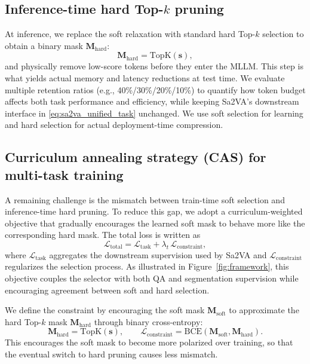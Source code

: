 \subsection{Inference-time hard Top-$k$ pruning}
\label{sec:method_topk_infer}
At inference, we replace the soft relaxation with standard hard Top-$k$ selection to obtain a binary mask $\mathbf{M}_{\mathrm{hard}}$:
\begin{equation}
\mathbf{M}_{\mathrm{hard}}=\mathrm{TopK}(\mathbf{s}),
\label{eq:method_hard_topk}
\end{equation}
and physically remove low-score tokens before they enter the MLLM.
This step is what yields actual memory and latency reductions at test time.
We evaluate multiple retention ratios (e.g., 40\%/30\%/20\%/10\%) to quantify how token budget affects both task performance and efficiency, while keeping Sa2VA's downstream interface in \eqref{eq:sa2va_unified_task} unchanged.
We use soft selection for learning and hard selection for actual deployment-time compression.

\subsection{Curriculum annealing strategy (CAS) for multi-task training}
\label{sec:method_cas}
A remaining challenge is the mismatch between train-time soft selection and inference-time hard pruning.
To reduce this gap, we adopt a curriculum-weighted objective that gradually encourages the learned soft mask to behave more like the corresponding hard mask.
The total loss is written as
\begin{equation}
\mathcal{L}_{\mathrm{total}} = \mathcal{L}_{\mathrm{task}} + \lambda_t\,\mathcal{L}_{\mathrm{constraint}},
\label{eq:method_total_loss}
\end{equation}
where $\mathcal{L}_{\mathrm{task}}$ aggregates the downstream supervision used by Sa2VA and $\mathcal{L}_{\mathrm{constraint}}$ regularizes the selection process. As illustrated in Figure~\ref{fig:framework}, this objective couples the selector with both QA and segmentation supervision while encouraging agreement between soft and hard selection.

We define the constraint by encouraging the soft mask $\mathbf{M}_{\mathrm{soft}}$ to approximate the hard Top-$k$ mask $\mathbf{M}_{\mathrm{hard}}$ through binary cross-entropy:
\begin{equation}
\mathbf{M}_{\mathrm{hard}} = \mathrm{TopK}(\mathbf{s}),\qquad
\mathcal{L}_{\mathrm{constraint}} = \mathrm{BCE}(\mathbf{M}_{\mathrm{soft}},\mathbf{M}_{\mathrm{hard}}).
\label{eq:method_constraint_bce}
\end{equation}
This encourages the soft mask to become more polarized over training, so that the eventual switch to hard pruning causes less mismatch.

